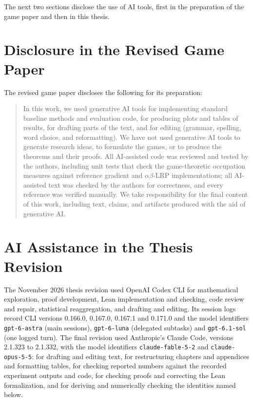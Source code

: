 The next two sections disclose the use of AI tools, first in the preparation of the game paper and then in this thesis.

\section{Disclosure in the Revised Game Paper}
The revised game paper discloses the following for its preparation:
\begin{quote}
In this work, we used generative AI tools for implementing standard baseline methods and evaluation
code, for producing plots and tables of results, for drafting parts of the text, and for editing
(grammar, spelling, word choice, and reformatting).
We have not used generative AI tools to generate research ideas, to formulate the games, or to
produce the theorems and their proofs.
All AI-assisted code was reviewed and tested by the authors, including unit tests that check the
game-theoretic occupation measures against reference gradient and $\alpha\beta$-LRP
implementations; all AI-assisted text was checked by the authors for correctness, and every
reference was verified manually.
We take responsibility for the final content of this work, including text, claims, and artifacts
produced with the aid of generative AI.
\end{quote}

\section{AI Assistance in the Thesis Revision}
The November 2026 thesis revision used OpenAI Codex CLI for mathematical exploration, proof development, Lean implementation and checking, code review and repair, statistical reaggregation, and drafting and editing. Its session logs record CLI versions 0.166.0, 0.167.0, 0.167.1 and 0.171.0 and the model identifiers \texttt{gpt-6-astra} (main sessions), \texttt{gpt-6-luna} (delegated subtasks) and \texttt{gpt-6.1-sol} (one logged turn). The final revision used Anthropic's Claude Code, versions 2.1.323 to 2.1.332, with the model identifiers \texttt{claude-fable-5-2} and \texttt{claude-opus-5-5}: for drafting and editing text, for restructuring chapters and appendices and formatting tables, for checking reported numbers against the recorded experiment outputs and code, for checking proofs and correcting the Lean formalization, and for deriving and numerically checking the identities named below.

